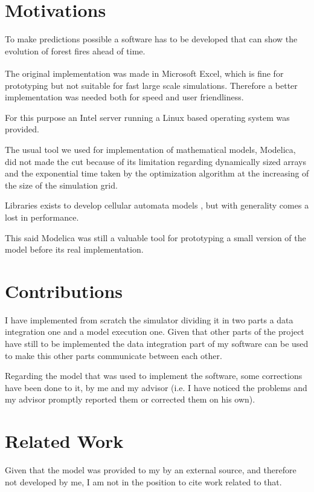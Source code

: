 \documentclass[Lau]{sapthesis} %
\let\oldsection\section
\def\subsection{\oldsection}
\def\section{\chapter}
\begin{document}
\subsection{Motivations}

To make predictions possible a software has to be developed that can show the
evolution of forest fires ahead of time.

The original implementation was made in Microsoft
Excel\textsuperscript{\textregistered}, which is fine for prototyping but not
suitable for fast large scale simulations. Therefore a better implementation was
needed both for speed and user friendliness.

For this purpose an Intel server running a Linux based operating system was
provided.

The usual tool we used for implementation of mathematical models, Modelica, did
not made the cut because of its limitation regarding dynamically sized arrays
and the exponential time taken by the optimization algorithm at the increasing
of the size of the simulation grid.

Libraries exists to develop cellular automata models \cite{calib2}, but with
generality comes a lost in performance.

This said Modelica was still a valuable tool for prototyping a small version of
the model before its real implementation.

\subsection{Contributions}

I have implemented from scratch the simulator dividing it in two parts a data
integration one and a model execution one. Given that other parts of the project
have still to be implemented the data integration part of my software can be
used to make this other parts communicate between each other.

Regarding the model that was used to implement the software, some corrections
have been done to it, by me and my advisor (i.e. I have noticed the problems and
my advisor promptly reported them or corrected them on his own).

\subsection{Related Work}

Given that the model was provided to my by an external source, and therefore not
developed by me, I am not in the position to cite work related to that.
\end{document}
